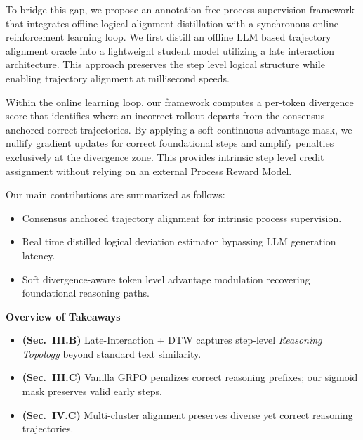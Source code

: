 \documentclass[conference]{IEEEtran}
\begin{document}
To bridge this gap, we propose an annotation-free process supervision framework that integrates offline logical alignment distillation with a synchronous online reinforcement learning loop. We first distill an offline LLM based trajectory alignment oracle into a lightweight student model utilizing a late interaction architecture. This approach preserves the step level logical structure while enabling trajectory alignment at millisecond speeds.

Within the online learning loop, our framework computes a per-token divergence score that identifies where an incorrect rollout departs from the consensus anchored correct trajectories. By applying a soft continuous advantage mask, we nullify gradient updates for correct foundational steps and amplify penalties exclusively at the divergence zone. This provides intrinsic step level credit assignment without relying on an external Process Reward Model.

Our main contributions are summarized as follows:
\begin{itemize}
    \item Consensus anchored trajectory alignment for intrinsic process supervision.
    \item Real time distilled logical deviation estimator bypassing LLM generation latency.
    \item Soft divergence-aware token level advantage modulation recovering foundational reasoning paths.
\end{itemize}

\begin{mdframed}[
  backgroundcolor=gray!8,
  linecolor=black!40,
  linewidth=0.8pt,
  innertopmargin=4pt,
  innerbottommargin=4pt,
  innerleftmargin=6pt,
  innerrightmargin=6pt
]
\textbf{Overview of Takeaways}
\vspace{-2pt}

\begin{itemize}\setlength{\itemsep}{0pt}
\item \textbf{(Sec.~III.B)}
Late-Interaction + DTW captures step-level
\emph{Reasoning Topology} beyond standard text similarity.

\item \textbf{(Sec.~III.C)}
Vanilla GRPO penalizes correct reasoning prefixes;
our sigmoid mask preserves valid early steps.

\item \textbf{(Sec.~IV.C)}
Multi-cluster alignment preserves diverse
yet correct reasoning trajectories.
\end{itemize}
\vspace{-2pt}
\end{mdframed}
\end{document}
